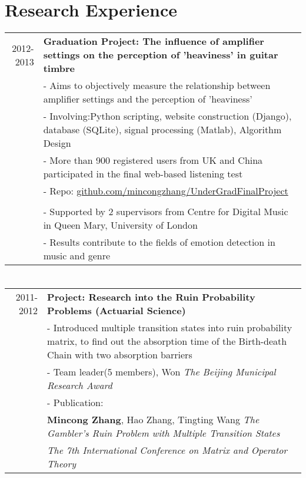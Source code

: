 \documentclass[a4paper,10pt]{article}
\begin{document}
\section{Research Experience}
\begin{tabular}{rp{12cm}}
2012-2013 & \textbf{Graduation Project: The influence of amplifier settings on the perception of 'heaviness' in guitar timbre}\\
& - Aims to objectively measure the relationship between amplifier settings and the perception of 'heaviness'\\
& - Involving:Python scripting, website construction (Django), database (SQLite), signal processing (Matlab), Algorithm Design\\
& - More than 900 registered users from UK and China participated in the final web-based listening test\\
& - Repo: \href{https://github.com/mincongzhang/UnderGradFinalProject}{github.com/mincongzhang/UnderGradFinalProject}\\
\\
& - Supported by 2 supervisors from Centre for Digital Music in Queen Mary, University of London\\
& - Results contribute to the fields of emotion detection in music and genre\\
\end{tabular}

\section{}
\begin{tabular}{rp{12cm}}
2011-2012 & \textbf{Project: Research into the Ruin Probability Problems (Actuarial Science)}\\
& - Introduced multiple transition states into ruin probability matrix, to find out the absorption time of the Birth-death Chain with two absorption barriers\\
& - Team leader(5 members), Won \emph{The Beijing Municipal Research Award}\\
& - Publication:\\
&\textbf{Mincong Zhang}, Hao Zhang, Tingting Wang   \emph{The Gambler's Ruin Problem with Multiple Transition States}\\
&\emph{The 7th International Conference on Matrix and Operator Theory}\\

\end{tabular}
\end{document}
